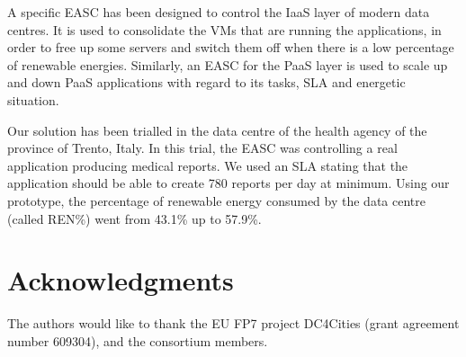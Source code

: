 \documentclass[conference]{IEEEtran}
\begin{document}
A specific EASC has been designed to control the IaaS layer of modern data centres. It is used to consolidate the VMs that are running the applications, in order to free up some servers and switch them off when there is a low percentage of renewable energies.
Similarly, an EASC for the PaaS layer is used to scale up and down PaaS applications with regard to its tasks, SLA and energetic situation.

Our solution has been trialled in the data centre of the health agency of the province of Trento, Italy.
In this trial, the EASC was controlling a real application producing medical reports.
We used an SLA stating that the application should be able to create 780 reports per day at minimum.
Using our prototype, the percentage of renewable energy consumed by the data centre (called REN\%) went from 43.1\% up to 57.9\%. 


\section{Acknowledgments}
The authors would like to thank the EU FP7 project DC4Cities (grant agreement number 609304), and the consortium members.


 
\end{document}
